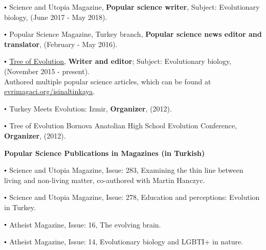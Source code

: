\documentclass[letterpaper,10.5pt]{article}
\newcommand\sbullet[1][.5]{\mathbin{\vcenter{\hbox{\scalebox{#1}{$\bullet$}}}}}
\begin{document}
$\sbullet[.6]$ \hspace{0.74cm}  Science and Utopia Magazine, \textbf{Popular science writer}, Subject: Evolutionary biology, (June 2017 - May 2018). \\
\smallskip

$\sbullet[.6]$ \hspace{0.74cm}  Popular Science Magazine, Turkey branch, \textbf{Popular science news editor and translator}, (February - May 2016). \\
\smallskip

$\sbullet[.6]$ \hspace{0.74cm}  \href{https://evrimagaci.org/isinaltinkaya/}{Tree of Evolution}, \textbf{Writer and editor}; Subject: Evolutionary biology, (November 2015 - present).\\
Authored multiple popular science articles, which can be found at \href{https://evrimagaci.org/isinaltinkaya/}{evrimagaci.org/isinaltinkaya}.

\smallskip

$\sbullet[.6]$ \hspace{0.74cm}  Turkey Meets Evolution: Izmir, \textbf{Organizer}, (2012). \\
\smallskip

$\sbullet[.6]$ \hspace{0.74cm}  Tree of Evolution Bornova Anatolian High School Evolution Conference, \textbf{Organizer}, (2012). \\
\smallskip

\textbf{Popular Science Publications in Magazines (in Turkish)}


\medskip

$\sbullet[.6]$ \hspace{0.74cm}  Science and Utopia Magazine, Issue: 283, Examining the thin line between living and non-living matter, co-authored with Martin Hanczyc.\\
\smallskip

$\sbullet[.6]$ \hspace{0.74cm}  Science and Utopia Magazine, Issue: 278, Education and perceptions: Evolution in Turkey. \\
\smallskip

$\sbullet[.6]$ \hspace{0.74cm}  Atheist Magazine, Issue: 16, The evolving brain. \\
\smallskip

$\sbullet[.6]$ \hspace{0.74cm}  Atheist Magazine, Issue: 14, Evolutionary biology and LGBTI+ in nature. \\
\smallskip
\end{document}

